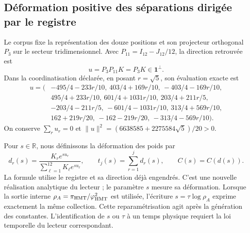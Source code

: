 \subsection{Déformation positive des séparations dirigée par le registre}

Le corpus fixe la représentation des douze positions et son projecteur
orthogonal \(P_3\) sur le secteur tridimensionnel. Avec
\(P_{11}=I_{12}-J_{12}/12\), la direction retrouvée est
\[
 u=P_3P_{11}K=P_3K\in\mathbf1^\perp.
\]
Dans la coordinatisation déclarée, en posant \(r=\sqrt5\), son évaluation exacte est
\begin{align*}
u=(&-495/4-233r/10,\ 403/4+169r/10,\ -403/4-169r/10,\\
   &495/4+233r/10,\ 601/4+1031r/10,\ 203/4+211r/5,\\
   &-203/4-211r/5,\ -601/4-1031r/10,\ 313/4+569r/10,\\
   &162+219r/20,\ -162-219r/20,\ -313/4-569r/10).
\end{align*}
On conserve \(\sum_ru_r=0\) et
\(\|u\|^2=(6638585+2275584\sqrt5)/20>0\).

Pour \(s\in\mathbb R\), nous définissons la déformation des poids par
\begin{equation}
 d_r(s)=\frac{K_re^{su_r}}{\sum_{\ell=1}^{12}K_\ell e^{su_\ell}},
 \qquad t_j(s)=\sum_{r=1}^jd_r(s),\qquad C(s)=C(d(s)).
 \label{eq:nc-gap-flow}
\end{equation}
La formule utilise le registre et sa direction déjà engendrés. C'est une nouvelle réalisation analytique du lecteur ; le paramètre \(s\) mesure sa déformation. Lorsque la sortie interne \(\rho_A=\pi_{\rm HMT}/\varphi_{\rm HMT}^2\) est utilisée, l'écriture \(s=\tau\log\rho_A\) exprime exactement la même collection. Cette reparamétrisation agit après la génération des constantes. L'identification de \(s\) ou \(\tau\) à un temps physique requiert la loi temporelle du lecteur correspondant.

